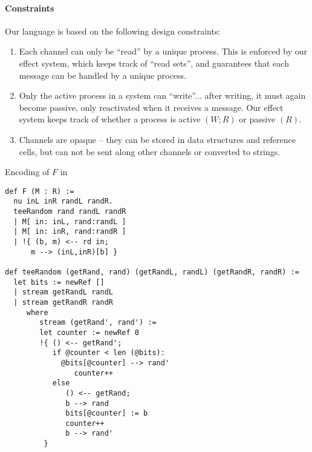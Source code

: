 \paragraph{Constraints}
Our language is based on the following design constraints:
\begin{enumerate}
\item Each channel can only be “read” by a unique process. This is enforced by our effect system, which keeps track of “read sets”, and guarantees that each message can be handled by a unique process.
\item Only the active process in a system can “write”... after writing, it must again become passive, only reactivated when it receives a message. Our effect system keeps track of whether a process is active $(W; R)$ or passive $(R)$.
\item Channels are opaque -- they can be stored in data structures and reference cells, but can not be sent along other channels or converted to strings.
\end{enumerate}



Encoding of $F$ in \lang
\begin{figure*}
\begin{lstlisting} 
def F (M : R) :=
  nu inL inR randL randR. 
  teeRandom rand randL randR
  | M[ in: inL, rand:randL ]
  | M[ in: inR, rand:randR ]
  | !{ (b, m) <-- rd in;
      m --> (inL,inR)[b] }

def teeRandom (getRand, rand) (getRandL, randL) (getRandR, randR) :=
  let bits := newRef []
  | stream getRandL randL
  | stream getRandR randR
     where
        stream (getRand', rand') :=
        let counter := newRef 0
        !{ () <-- getRand';
           if @counter < len (@bits):
             @bits[@counter] --> rand'
                counter++
           else
              () <-- getRand; 
              b --> rand
              bits[@counter] := b
              counter++
              b --> rand'
         }
\end{lstlisting}
\end{figure*}

